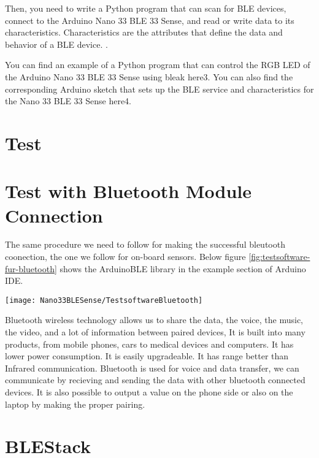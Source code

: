 \medskip

Then, you need to write a Python program that can scan for BLE devices, connect to the Arduino Nano 33 BLE 33 Sense, and read or write data to its characteristics. Characteristics are the attributes that define the data and behavior of a BLE device. .

You can find an example of a Python program that can control the RGB LED of the Arduino Nano 33 BLE 33 Sense using bleak here3. You can also find the corresponding Arduino sketch that sets up the BLE service and characteristics for the Nano 33 BLE 33 Sense here4.


\section{Test}


\section{Test with Bluetooth Module Connection}

The same procedure we need to follow for making the successful bleutooth coonection, the one we follow for on-board sensors. Below figure \ref{fig:testsoftware-fur-bluetooth} shows the ArduinoBLE library in the example section of Arduino IDE.

\begin{center}
    \texttt{[image: Nano33BLESense/TestsoftwareBluetooth]}
    \label{fig:testsoftware-fur-bluetooth}
\end{center}

Bluetooth wireless technology allows us to share the data, the voice, the music, the video, and a lot of information between paired devices, It is built into many products, from mobile phones, cars to medical devices and computers. It has lower power consumption. It is easily upgradeable. It has range better than Infrared communication. Bluetooth is used for voice and data transfer, we can communicate by recieving and sending the data with other bluetooth connected devices. It is also possible to output a value on the phone side or also on the laptop by making the proper pairing. 





\section{BLEStack}


